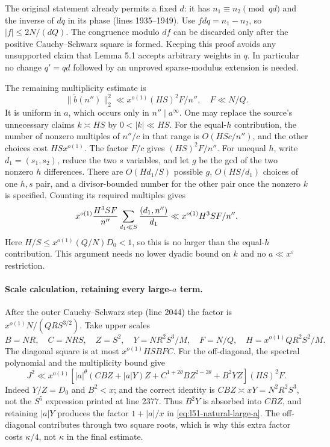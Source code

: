 The original statement already permits a fixed $d$: it has
$n_1\equiv n_2\pmod{qd}$ and the inverse of $dq$ in its phase
(lines 1935--1949).  Use $fdq=n_1-n_2$, so $|f|\leq2N/(dQ)$.
The congruence modulo $df$ can be discarded only after the positive
Cauchy--Schwarz square is formed.  Keeping this proof avoids any
unsupported claim that Lemma 5.1 accepts arbitrary weights in $q$.
In particular no change $q'=qd$ followed by an unproved sparse-modulus
extension is needed.

The remaining multiplicity estimate is
\[
 \|\widetilde b(n'')\|_2^2\ll x^{o(1)}(HS)^2F/n'',\quad F\ll N/Q.
\]
It is uniform in $a$, which occurs only in $n''\mid a^\infty$.
One may replace the source's unnecessary claims $k\asymp HS$ by
$0<|k|\ll HS$.  For the equal-$h$ contribution, the number of nonzero
multiples of $n''/c$ in that range is $O(HSc/n'')$, and the other choices
cost $HSx^{o(1)}$.  The factor $F/c$ gives $(HS)^2F/n''$.
For unequal $h$, write $d_1=(s_1,s_2)$, reduce the two $s$ variables,
and let $g$ be the gcd of the two nonzero $h$ differences.  There are
$O(Hd_1/S)$ possible $g$, $O(HS/d_1)$ choices of one $h,s$ pair,
and a divisor-bounded number for the other pair once the nonzero $k$
is specified.  Counting its required multiples gives
\[
 x^{o(1)}{H^3SF\over n''}
 \sum_{d_1\ll S}{(d_1,n'')\over d_1}
 \ll x^{o(1)}H^3SF/n''.
\]
Here $H/S\leq x^{o(1)}(Q/N)D_0<1$, so this is no larger than the
equal-$h$ contribution.  This argument needs no lower dyadic bound
on $k$ and no $a\ll x^\varepsilon$ restriction.

\paragraph{Scale calculation, retaining every large-$a$ term.}
After the outer Cauchy--Schwarz step (line 2044) the factor is
$x^{o(1)}N/(QRS^{3/2})$.  Take upper scales
\[
 B=NR,\quad C=NRS,\quad Z=S^2,\quad
 Y=NR^2S^3/M,\quad F=N/Q,\quad H=x^{o(1)}QR^2S^2/M.
\]
The diagonal square is at most $x^{o(1)}HSBFC$.
For the off-diagonal, the spectral polynomial and the multiplicity
bound give
\[
 J^2\ll x^{o(1)}\left[
 |a|^\theta(CBZ+|a|Y)Z+
 C^{1+2\theta}BZ^{2-2\theta}+B^2YZ\right](HS)^2F.
\]
Indeed $Y/Z=D_0$ and $B^2<x$; and the correct identity is
$CBZ\asymp xY=N^2R^2S^3$, not the $S^5$ expression printed at line
2377.  Thus $B^2Y$ is absorbed into $CBZ$, and retaining $|a|Y$
produces the factor $1+|a|/x$ in
\eqref{eq:l51-natural-large-a}.  The off-diagonal contributes through
two square roots, which is why this extra factor costs $\kappa/4$,
not $\kappa$ in the final estimate.

